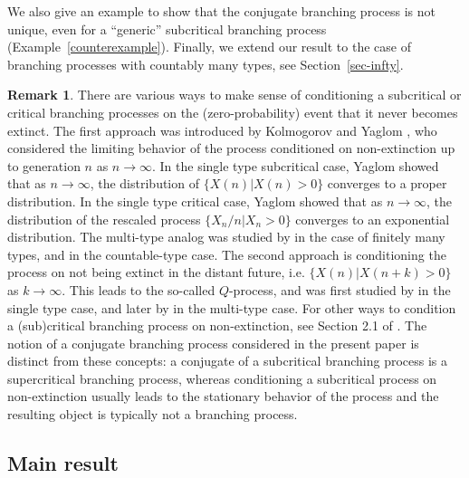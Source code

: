 \documentclass[11pt]{article}
\theoremstyle{plain}
\theoremstyle{definition}
\newtheorem{remark}[thm]{Remark}
\numberwithin{equation}{section}
\begin{document}
We also give an example to show that the conjugate branching process is not unique, even for a ``generic'' subcritical branching process (Example~\ref{counterexample}).
Finally, we extend our result to the case of branching processes with countably many types, see Section~\ref{sec-infty}. 

\begin{remark}
There are various ways to make sense of conditioning a subcritical or critical branching processes on the (zero-probability) event that it never becomes extinct. The first approach was introduced by Kolmogorov \cite{kolmogorov1938losung} and Yaglom \cite{yaglom1947certain}, who considered the limiting behavior of the process conditioned on non-extinction up to generation $n$ as $n \to \infty$. In the single type subcritical case, Yaglom \cite{yaglom1947certain} showed that as $n \to \infty$, the distribution of $\{ X(n) | X(n)>0 \}$ converges to a proper distribution. In the single type critical case, Yaglom \cite{yaglom1947certain} showed that as $n \to \infty$, the distribution of the rescaled process $\{X_n/n|X_n>0\}$ converges to an exponential distribution. The multi-type analog was studied by \cite{harris1963theory, jirina1957asymptotic, joffe1967, mullikin1963} in the case of finitely many types, and \cite{seneta1966quasi} in the countable-type case. The second approach is conditioning the process on not being extinct in the distant future, i.e. $\{X(n) | X(n+k)>0\}$ as $k \to \infty$. This leads to the so-called $Q$-process, and was first studied by \cite{lamperti1968conditioned} in the single type case, and later by \cite{dallaporta2008q} in the multi-type case. For other ways to condition a (sub)critical branching process on non-extinction, see Section 2.1 of \cite{Penisson-thesis}. The notion of a conjugate branching process considered in the present paper is distinct from these concepts: a conjugate of a subcritical branching process is a supercritical branching process, whereas conditioning a subcritical process on non-extinction usually leads to the stationary behavior of the process and the resulting object is typically not a branching process.
\end{remark}


\subsection{Main result}
\label{sec-result}
\end{document}
